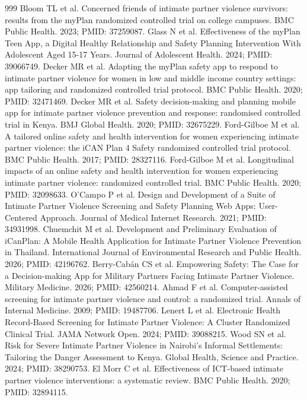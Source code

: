 \documentclass[11pt]{article}
\begin{document}
\begin{thebibliography}{999}
 Bloom TL et al. Concerned friends of intimate partner violence survivors: results from the myPlan randomized controlled trial on college campuses. BMC Public Health. 2023; PMID: 37259087.
 Glass N et al. Effectiveness of the myPlan Teen App, a Digital Healthy Relationship and Safety Planning Intervention With Adolescent Aged 15-17 Years. Journal of Adolescent Health. 2024; PMID: 39066749.
 Decker MR et al. Adapting the myPlan safety app to respond to intimate partner violence for women in low and middle income country settings: app tailoring and randomized controlled trial protocol. BMC Public Health. 2020; PMID: 32471469.
 Decker MR et al. Safety decision-making and planning mobile app for intimate partner violence prevention and response: randomised controlled trial in Kenya. BMJ Global Health. 2020; PMID: 32675229.
 Ford-Gilboe M et al. A tailored online safety and health intervention for women experiencing intimate partner violence: the iCAN Plan 4 Safety randomized controlled trial protocol. BMC Public Health. 2017; PMID: 28327116.
 Ford-Gilboe M et al. Longitudinal impacts of an online safety and health intervention for women experiencing intimate partner violence: randomized controlled trial. BMC Public Health. 2020; PMID: 32098633.
 O'Campo P et al. Design and Development of a Suite of Intimate Partner Violence Screening and Safety Planning Web Apps: User-Centered Approach. Journal of Medical Internet Research. 2021; PMID: 34931998.
 Chuemchit M et al. Development and Preliminary Evaluation of iCanPlan: A Mobile Health Application for Intimate Partner Violence Prevention in Thailand. International Journal of Environmental Research and Public Health. 2026; PMID: 42196762.
 Berry-Cabán CS et al. Empowering Safety: The Case for a Decision-making App for Military Partners Facing Intimate Partner Violence. Military Medicine. 2026; PMID: 42560214.
 Ahmad F et al. Computer-assisted screening for intimate partner violence and control: a randomized trial. Annals of Internal Medicine. 2009; PMID: 19487706.
 Lenert L et al. Electronic Health Record-Based Screening for Intimate Partner Violence: A Cluster Randomized Clinical Trial. JAMA Network Open. 2024; PMID: 39088215.
 Wood SN et al. Risk for Severe Intimate Partner Violence in Nairobi's Informal Settlements: Tailoring the Danger Assessment to Kenya. Global Health, Science and Practice. 2024; PMID: 38290753.
 El Morr C et al. Effectiveness of ICT-based intimate partner violence interventions: a systematic review. BMC Public Health. 2020; PMID: 32894115.

\end{thebibliography}
\end{document}
